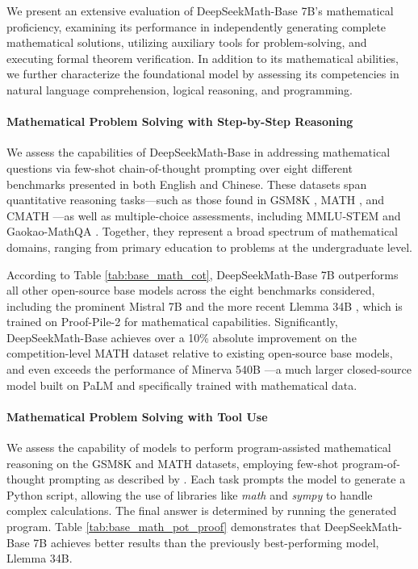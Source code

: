 We present an extensive evaluation of DeepSeekMath-Base 7B's mathematical proficiency, examining its performance in independently generating complete mathematical solutions, utilizing auxiliary tools for problem-solving, and executing formal theorem verification. In addition to its mathematical abilities, we further characterize the foundational model by assessing its competencies in natural language comprehension, logical reasoning, and programming.

\paragraph{Mathematical Problem Solving with Step-by-Step Reasoning}

We assess the capabilities of DeepSeekMath-Base in addressing mathematical questions via few-shot chain-of-thought prompting \citep{cot} over eight different benchmarks presented in both English and Chinese. These datasets span quantitative reasoning tasks—such as those found in GSM8K \citep{gsm8k}, MATH \citep{MATH}, and CMATH \citep{wei2023cmath}—as well as multiple-choice assessments, including MMLU-STEM \citep{mmlu} and Gaokao-MathQA \citep{agieval}. Together, they represent a broad spectrum of mathematical domains, ranging from primary education to problems at the undergraduate level.

According to Table \ref{tab:base_math_cot}, DeepSeekMath-Base 7B outperforms all other open-source base models across the eight benchmarks considered, including the prominent Mistral 7B \citep{mistral} and the more recent Llemma 34B \citep{llemma}, which is trained on Proof-Pile-2 \citep{llemma} for mathematical capabilities. Significantly, DeepSeekMath-Base achieves over a 10\% absolute improvement on the competition-level MATH dataset relative to existing open-source base models, and even exceeds the performance of Minerva 540B \citep{minerva}—a much larger closed-source model built on PaLM \citep{palm} and specifically trained with mathematical data.

\paragraph{Mathematical Problem Solving with Tool Use} We assess the capability of models to perform program-assisted mathematical reasoning on the GSM8K and MATH datasets, employing few-shot program-of-thought prompting as described by \citep{pot,pal}. Each task prompts the model to generate a Python script, allowing the use of libraries like \textit{math} and \textit{sympy} to handle complex calculations. The final answer is determined by running the generated program. Table \ref{tab:base_math_pot_proof} demonstrates that DeepSeekMath-Base 7B achieves better results than the previously best-performing model, Llemma 34B.

